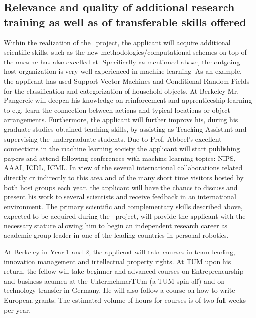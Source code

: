 \subsection{Relevance and quality of additional research training as well as of transferable skills offered}
\label{sec:trans_skills}
Within the realization of the  \ksem\ project, the applicant will acquire additional 
scientific skills, such as the new methodologies/computational schemes on top of the 
ones he has also excelled at. Specifically as mentioned above, the outgoing host organization 
is very well experienced in machine learning.  As an example, the applicant has used Support Vector Machines
and Conditional Random Fields for the classification and categorization of household objects.
At Berkeley Mr. Pangercic will deepen his knowledge on reinforcement and apprenticeship learning
to e.g. learn the connection between actions and typical locations or object arrangements.
Furthermore, the applicant will further improve his, during his graduate studies obtained teaching 
skills, by assisting as Teaching Assistant and supervising the undergraduate students.
Due to Prof. Abbeel's excellent connections in the machine learning society the applicant 
will start publishing papers and attend following conferences with machine learning topics:
NIPS, AAAI, ICDL, ICML. In view of the several international collaborations related directly 
or indirectly to this area and of the many short time visitors hosted by both host groups each year, 
the applicant will have the  chance to discuss and present his work to several scientists and 
receive feedback in an international environment. The primary scientific and 
complementary skills described above, expected to be acquired during the \ksem\ 
project, will provide the applicant  with  the necessary stature allowing  him to begin an 
independent research career as academic group leader in one of the leading countries in personal
robotics.

At Berkeley in Year 1 and 2, the applicant will take courses in team leading, innovation management 
and intellectual property rights. At TUM upon his return, the fellow will take beginner and advanced 
courses on Entrepreneurship and business acumen at the UntermehmerTUm (a TUM spin-off) and on 
technology transfer in Germany. He will also follow a course on how to write European grants.
The estimated volume of hours for courses is of two full weeks per year.
